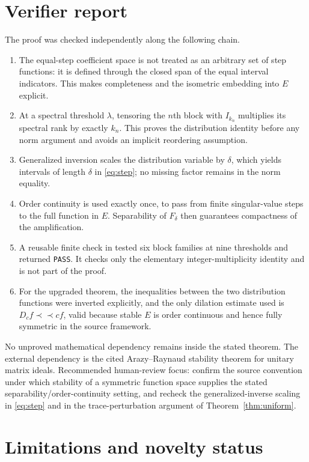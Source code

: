 \documentclass[11pt]{amsart}
\begin{document}
\section*{Verifier report}

The proof was checked independently along the following chain.
\begin{enumerate}
\item The equal-step coefficient space is not treated as an arbitrary set of
step functions: it is defined through the closed span of the equal interval
indicators.  This makes completeness and the isometric embedding into $E$
explicit.
\item At a spectral threshold $\lambda$, tensoring the $n$th block with
$I_{k_n}$ multiplies its spectral rank by exactly $k_n$.  This proves the
distribution identity before any norm argument and avoids an implicit
reordering assumption.
\item Generalized inversion scales the distribution variable by $\delta$,
which yields intervals of length $\delta$ in \eqref{eq:step}; no missing
factor remains in the norm equality.
\item Order continuity is used exactly once, to pass from finite singular-value
steps to the full function in $E$.  Separability of $F_\delta$ then guarantees
compactness of the amplification.
\item A reusable finite check in
 tested six block families at
nine thresholds and returned \texttt{PASS}.  It checks only the elementary
integer-multiplicity identity and is not part of the proof.
\item For the upgraded theorem, the inequalities between the two distribution
functions were inverted explicitly, and the only dilation estimate used is
$D_cf\prec\!\prec cf$, valid because stable $E$ is order continuous and hence
fully symmetric in the source framework.
\end{enumerate}

No unproved mathematical dependency remains inside the stated theorem.  The
external dependency is the cited Arazy--Raynaud stability theorem for unitary
matrix ideals.  Recommended human-review focus: confirm the source convention
under which stability of a symmetric function space supplies the stated
separability/order-continuity setting, and recheck the generalized-inverse
scaling in \eqref{eq:step} and in the trace-perturbation argument of
Theorem~\ref{thm:uniform}.

\section*{Limitations and novelty status}
\end{document}
